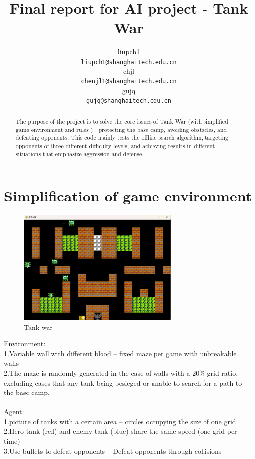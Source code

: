 \documentclass{article}
\title{Final report for AI project - Tank War}
\author{
  liupch1 \\
  \texttt{liupch1@shanghaitech.edu.cn}\\
      \AND
  chjl \\
  \texttt{chenjl1@shanghaitech.edu.cn}\\ 
      \AND 
  gujq  \\
  \texttt{gujq@shanghaitech.edu.cn}  
}
\begin{document}
	
	\maketitle
	
	\begin{abstract}
		The purpose of the project is to solve the core issues of Tank War (with simplified game environment and rules ) - protecting the base camp, avoiding obstacles, and defeating opponents. This code mainly tests the offline search algorithm, targeting opponents of three different difficulty levels, and achieving results in different situations that emphasize aggression and defense.
	\end{abstract}
	
	
	\section{Simplification of game environment}
	\begin{figure}[H]
		\centering
		\includegraphics[width=0.7\textwidth]{game.png}
		\caption{Tank war}
	\end{figure} 
	Environment:\\
	1.Variable wall with different blood -- fixed maze per game with unbreakable walls \\
	2.The maze is randomly generated in the case of walls with a 20\% grid ratio, excluding cases that any tank being besieged or unable to search for a path to the base camp.\\
	\space\\
	Agent:\\
	1.picture of tanks with a certain area -- circles occupying the size of one grid \\
	2.Hero tank (red) and enemy tank (blue) share the same speed (one grid per time)\\
	3.Use bullets to defeat opponents -- Defeat opponents through collisions\\
	
\end{document}
